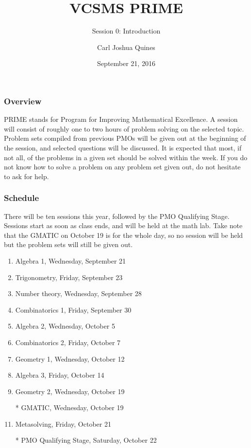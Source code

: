 \documentclass[10pt,paper=letter]{scrartcl}
\begin{document}
\title{VCSMS PRIME}
\subtitle{Session 0: Introduction}
\author{Carl Joshua Quines}
\date{September 21, 2016}

\maketitle

\subsubsection*{Overview}

PRIME stands for Program for Improving Mathematical Excellence. A session will consist of roughly one to two hours of problem solving on the selected topic. Problem sets compiled from previous PMOs will be given out at the beginning of the session, and selected questions will be discussed. It is expected that most, if not all, of the problems in a given set should be solved within the week. If you do not know how to solve a problem on any problem set given out, do not hesitate to ask for help.

\subsubsection*{Schedule}

There will be ten sessions this year, followed by the PMO Qualifying Stage. Sessions start as soon as class ends, and will be held at the math lab. Take note that the GMATIC on October 19 is for the whole day, so no session will be held but the problem sets will still be given out.

\begin{enumerate}

\item Algebra 1, Wednesday, September 21

\item Trigonometry, Friday, September 23 

\item Number theory, Wednesday, September 28 

\item Combinatorics 1, Friday, September 30

\item Algebra 2, Wednesday, October 5

\item Combinatorics 2, Friday, October 7

\item Geometry 1, Wednesday, October 12

\item Algebra 3, Friday, October 14

\item Geometry 2, Wednesday, October 19

\item[*] GMATIC, Wednesday, October 19

\item Metasolving, Friday, October 21

\item[*] PMO Qualifying Stage, Saturday, October 22

\end{enumerate}
\end{document}
